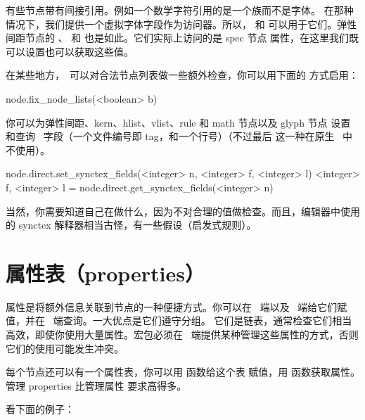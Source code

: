 有些节点带有间接引用。例如一个数学字符引用的是一个族而不是字体。
在那种情况下，我们提供一个虚拟字体字段作为访问器。所以，
和  可以用于它们。弹性间距节点的 、
 和  也是如此。它们实际上访问的是 spec 节点
属性，在这里我们既可以设置也可以获取这些值。

在某些地方，\LUATEX\ 可以对合法节点列表做一些额外检查，你可以用下面的
方式启用：

\begin{typing}
node.fix_node_lists(<boolean> b)
\end{typing}

你可以为弹性间距、kern、hlist、vlist、rule 和 math 节点以及 glyph 节点
设置和查询 \SYNCTEX\ 字段（一个文件编号即 tag，和一个行号）（不过最后
这一种在原生 \SYNCTEX\ 中不使用）。

\begin{typing}
node.direct.set_synctex_fields(<integer> n, <integer> f, <integer> l)
<integer> f, <integer> l =
    node.direct.get_synctex_fields(<integer> n)
\end{typing}

当然，你需要知道自己在做什么，因为不对合理的值做检查。而且，编辑器中使用的
synctex 解释器相当古怪，有一些假设（启发式规则）。

\section{属性表（properties）}



属性是将额外信息关联到节点的一种便捷方式。你可以在 \TEX\ 端以及
\LUA\ 端给它们赋值，并在 \LUA\ 端查询。一大优点是它们遵守分组。
它们是链表，通常检查它们相当高效，即使你使用大量属性。宏包必须在
\TEX\ 端提供某种管理这些属性的方式，否则它们的使用可能发生冲突。

每个节点还可以有一个属性表，你可以用  函数给这个表
赋值，用  函数获取属性。管理 properties 比管理属性
要求高得多。

看下面的例子：

\begin{typing}
\end{typing}

